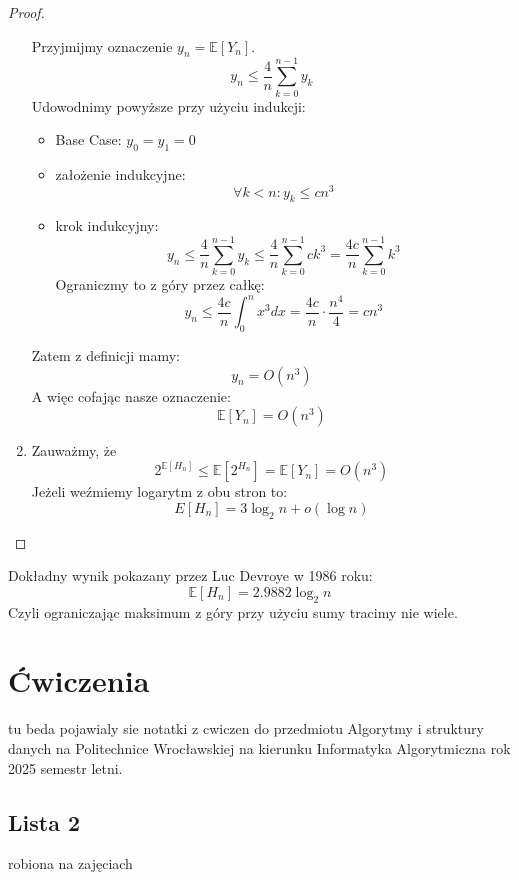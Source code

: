 \documentclass[11pt,a4paper]{article}
\begin{document}
\begin{proof}
\begin{enumerate}
\[            \]
            Przyjmijmy oznaczenie $y_n = \mathbb{E}[Y_n]$.
            \[
                y_n \leq \frac{4}{n} \sum_{k=0}^{n-1} y_k
            \]
            Udowodnimy powyższe przy użyciu indukcji:
            \begin{itemize}
                \item Base Case: $y_0=y_1=0$
                \item założenie indukcyjne:
                    \[
                        \forall k < n: y_k \leq cn^3
                    \]
                \item krok indukcyjny:
                    \[
                        y_n \leq \frac{4}{n} \sum_{k=0}^{n-1} y_k \leq \frac{4}{n} \sum_{k=0}^{n-1} c k^3 = \frac{4c}{n} \sum_{k=0}^{n-1} k^3
                    \]
                    Ograniczmy to z góry przez całkę:
                    \[
                        y_n \leq \frac{4c}{n} \int_0^{n} x^3 dx = \frac{4c}{n} \cdot \frac{n^4}{4} = cn^3
                    \]
            \end{itemize}
            Zatem z definicji mamy:
            \[
                y_n = O(n^3)
            \]
            A więc cofając nasze oznaczenie:
            \[
                \mathbb{E}[Y_n] = O(n^3)
            \]
        \item Zauważmy, że
            \[
                2^{\mathbb{E}[H_n]} \leq \mathbb{E}[2^{H_n}] = \mathbb{E}[Y_n] = O(n^3)
            \]
            Jeżeli weźmiemy logarytm z obu stron to:
            \[
                E[H_n] = 3 \log_2 n + o(\log n)
            \]
\end{enumerate}
\end{proof}
Dokładny wynik pokazany przez Luc Devroye w 1986 roku:
\[
    \mathbb{E}[H_n] = 2.9882 \log_2 n
\]
Czyli ograniczając maksimum z góry przy użyciu sumy tracimy nie wiele.




\section{Ćwiczenia}
tu beda pojawialy sie notatki z cwiczen do przedmiotu Algorytmy i struktury danych na Politechnice Wrocławskiej na kierunku Informatyka Algorytmiczna rok 2025 semestr letni.

\subsection{Lista 2}
robiona na zajęciach \date{2025-03-10}
\end{document}

